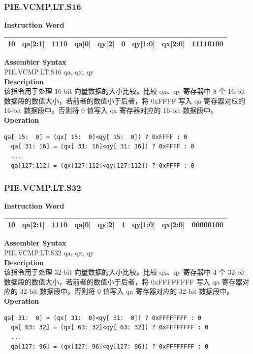 \newpage
\subsubsection{PIE.VCMP.LT.S16}\label{instruction:PIEVCMPLTS16}
\setlength\tabcolsep{6pt}
\textbf{Instruction Word} \\
\begin{tabular}{|c|c|c|c|c|c|c|c|c|}
	\hline
	10 & qa[2:1] & 1110 & qa[0] & qy[2] & 0 & qy[1:0] & qx[2:0] & 11110100 \\
	\hline
\end{tabular}

\textbf{Assembler Syntax} \\
PIE.VCMP.LT.S16 qa, qx, qy \\
\textbf{Description} \\
该指令用于处理 16-bit 向量数据的大小比较。比较 qx、qy 寄存器中 8 个 16-bit 数据段的数值大小，若前者的数值小于后者，将 0xFFFF 写入 qa 寄存器对应的 16-bit 数据段中。否则将 0 值写入 qa 寄存器对应的 16-bit 数据段中。\\
\textbf{Operation}
\begin{lstlisting}[escapeinside=`?]
  qa[ 15:  0] = (qx[ 15:  0]<qy[ 15:  0]) ? 0xFFFF : 0
  qa[ 31: 16] = (qx[ 31: 16]<qy[ 31: 16]) ? 0xFFFF : 0
  ...
  qa[127:112] = (qx[127:112]<qy[127:112]) ? 0xFFFF : 0
\end{lstlisting}

\newpage
\subsubsection{PIE.VCMP.LT.S32}\label{instruction:PIEVCMPLTS32}
\setlength\tabcolsep{6pt}
\textbf{Instruction Word} \\
\begin{tabular}{|c|c|c|c|c|c|c|c|c|}
	\hline
	10 & qa[2:1] & 1110 & qa[0] & qy[2] & 1 & qy[1:0] & qx[2:0] & 00000100 \\
	\hline
\end{tabular}

\textbf{Assembler Syntax} \\
PIE.VCMP.LT.S32 qa, qx, qy \\
\textbf{Description} \\
该指令用于处理 32-bit 向量数据的大小比较。比较 qx、qy 寄存器中 4 个 32-bit 数据段的数值大小，若前者的数值小于后者，将 0xFFFFFFFF 写入 qa 寄存器对应的 32-bit 数据段中。否则将 0 值写入 qa 寄存器对应的 32-bit 数据段中。\\
\textbf{Operation}
\begin{lstlisting}[escapeinside=`?]
  qa[ 31:  0] = (qx[ 31:  0]<qy[ 31:  0]) ? 0xFFFFFFFF : 0
  qa[ 63: 32] = (qx[ 63: 32]<qy[ 63: 32]) ? 0xFFFFFFFF : 0
  ...
  qa[127: 96] = (qx[127: 96]<qy[127: 96]) ? 0xFFFFFFFF : 0
\end{lstlisting}

